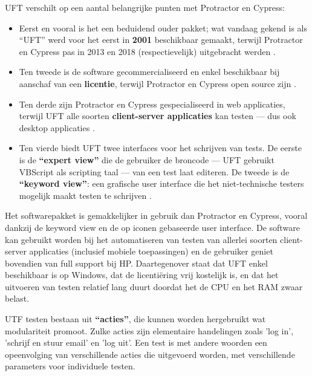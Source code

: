 UFT verschilt op een aantal belangrijke punten met Protractor en Cypress:
\begin{itemize}
    \item Eerst en vooral is het een beduidend ouder pakket; wat vandaag gekend is als ``UFT'' werd voor het eerst in \textbf{2001} beschikbaar gemaakt, terwijl Protractor en Cypress pas in 2013 en 2018 (respectievelijk) uitgebracht werden \autocite{Swati2020,Mann2018,Amorim2014}.
    
    \item Ten tweede is de software gecommercialiseerd en enkel beschikbaar bij aanschaf van een \textbf{licentie}, terwijl Protractor en Cypress open source zijn \autocite{Guru99SeleniumUFTDifference,VSoftUFTvsSelenium,Mann2017,Kumar}.

    \item Ten derde zijn Protractor en Cypress gespecialiseerd in web applicaties, terwijl UFT alle soorten \textbf{client-server applicaties} kan testen — dus ook desktop applicaties \autocite{Tribbiani2017,Cypress1,Amorim2014}.

    \item Ten vierde biedt UFT twee interfaces voor het schrijven van tests. De eerste is de \textbf{``expert view''} die de gebruiker de broncode — UFT gebruikt VBScript als scripting taal \autocite{Rajkumar2017} — van een test laat editeren. De tweede is de \textbf{``keyword view''}: een grafische user interface die het niet-technische testers mogelijk maakt testen te schrijven \autocite{Guru99WhatIsQTPUFT}.
\end{itemize}

Het softwarepakket is gemakkelijker in gebruik dan Protractor en Cypress, vooral dankzij de keyword view en de op iconen gebaseerde user interface. De software kan gebruikt worden bij het automatiseren van testen van allerlei soorten client-server applicaties (inclusief mobiele toepassingen) en de gebruiker geniet bovendien van full support bij HP. Daartegenover staat dat UFT enkel beschikbaar is op Windows, dat de licentiëring vrij kostelijk is, en dat het uitvoeren van testen relatief lang duurt doordat het de CPU en het RAM zwaar belast. \autocite{TutorialspointQTPQuickGuide,Arvy2011,Guru99SeleniumUFTDifference,Michaeli2016}

UTF testen bestaan uit \textbf{``acties''}, die kunnen worden hergebruikt wat modulariteit promoot. Zulke acties zijn elementaire handelingen zoals 'log in', 'schrijf en stuur email' en 'log uit'. Een test is met andere woorden een opeenvolging van verschillende acties die uitgevoerd worden, met verschillende parameters voor individuele testen. \autocite{TutorialspointQTPQuickGuide,Guru99ActionsInQTPUFT}


